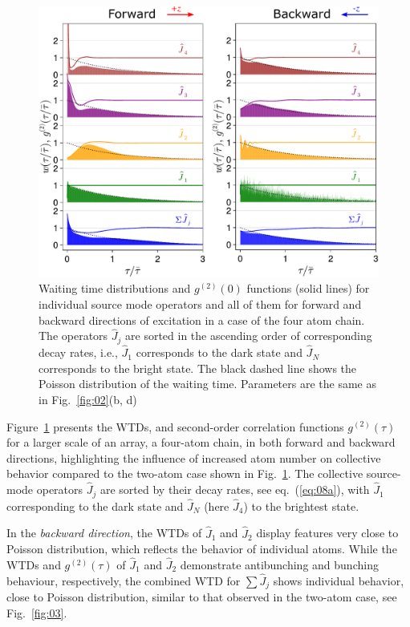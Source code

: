\documentclass[aps,prl,twocolumn,superscriptaddress,showpacs,amsmath,amssymb]{revtex4-2}
\begin{document}
\begin{figure}
    \begin{center}
        \includegraphics[width=0.95\columnwidth]{fig_4}
    \end{center}
    \caption{Waiting time distributions and $g^{(2)}(0)$ functions (solid lines) for individual source mode operators and all of them for forward and backward directions of excitation in a case of the four atom chain. The operators $\hat{J}_j$ are sorted in the ascending order of corresponding decay rates, i.e., $\hat{J}_1$ corresponds to the dark state and $\hat{J}_N$ corresponds to the bright state. The black dashed line shows the Poisson distribution of the waiting time. Parameters are the same as in Fig.~\ref{fig:02}(b, d)}\label{fig:04}
\end{figure}

Figure~\ref{fig:04} presents the WTDs, and second-order correlation functions $ g^{(2)}(\tau) $ for a larger scale of an array, a four-atom chain, in both forward and backward directions, highlighting the influence of increased atom number on collective behavior compared to the two-atom case shown in
Fig.~\ref{fig:04}. The collective source-mode operators $ \hat{J}_j $ are sorted by their decay rates, see eq.~(\ref{eq:08a}), with $ \hat{J}_1 $ corresponding to the dark state and $ \hat{J}_N $ (here $ \hat{J}_4 $) to the brightest state.

In the \textit{backward direction}, the WTDs of $ \hat{J}_1 $ and $ \hat{J}_2 $ display features very close to Poisson distribution, which reflects the behavior of individual atoms.
While the WTDs and $g^{(2)}(\tau)$ of $ \hat{J}_1 $ and $ \hat{J}_2 $ demonstrate antibunching and bunching behaviour, respectively, the combined WTD for $ \sum \hat{J}_j $ shows individual behavior, close to Poisson distribution, similar to that observed in the two-atom case, see Fig.~\ref{fig:03}.
\end{document}
